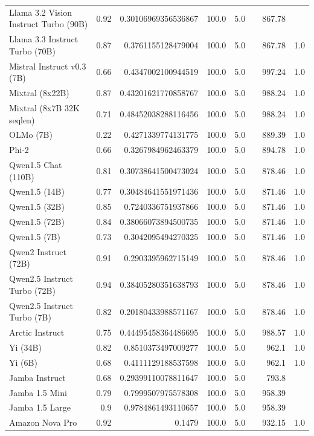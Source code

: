 \begin{table}[htp]
{\begin{tabular}{lrrrrrrr}
Llama 3.2 Vision Instruct Turbo (90B) & 0.92 & 0.30106969356536867 & 100.0 & 5.0 &  & 867.78 &  \\
Llama 3.3 Instruct Turbo (70B) & 0.87 & 0.3761155128479004 & 100.0 & 5.0 &  & 867.78 & 1.0 \\
Mistral Instruct v0.3 (7B) & 0.66 & 0.4347002100944519 & 100.0 & 5.0 &  & 997.24 & 1.0 \\
Mixtral (8x22B) & 0.87 & 0.43201621770858767 & 100.0 & 5.0 &  & 988.24 & 1.0 \\
Mixtral (8x7B 32K seqlen) & 0.71 & 0.48452038288116456 & 100.0 & 5.0 &  & 988.24 & 1.0 \\
OLMo (7B) & 0.22 & 0.4271339774131775 & 100.0 & 5.0 &  & 889.39 & 1.0 \\
Phi-2 & 0.66 & 0.3267984962463379 & 100.0 & 5.0 &  & 894.78 & 1.0 \\
Qwen1.5 Chat (110B) & 0.81 & 0.30738641500473024 & 100.0 & 5.0 &  & 878.46 & 1.0 \\
Qwen1.5 (14B) & 0.77 & 0.30484641551971436 & 100.0 & 5.0 &  & 871.46 & 1.0 \\
Qwen1.5 (32B) & 0.85 & 0.7240336751937866 & 100.0 & 5.0 &  & 871.46 & 1.0 \\
Qwen1.5 (72B) & 0.84 & 0.38066073894500735 & 100.0 & 5.0 &  & 871.46 & 1.0 \\
Qwen1.5 (7B) & 0.73 & 0.3042095494270325 & 100.0 & 5.0 &  & 871.46 & 1.0 \\
Qwen2 Instruct (72B) & 0.91 & 0.2903395962715149 & 100.0 & 5.0 &  & 878.46 & 1.0 \\
Qwen2.5 Instruct Turbo (72B) & 0.94 & 0.38405280351638793 & 100.0 & 5.0 &  & 878.46 & 1.0 \\
Qwen2.5 Instruct Turbo (7B) & 0.82 & 0.20180433988571167 & 100.0 & 5.0 &  & 878.46 & 1.0 \\
Arctic Instruct & 0.75 & 0.44495458364486695 & 100.0 & 5.0 &  & 988.57 & 1.0 \\
Yi (34B) & 0.82 & 0.8510373497009277 & 100.0 & 5.0 &  & 962.1 & 1.0 \\
Yi (6B) & 0.68 & 0.4111129188537598 & 100.0 & 5.0 &  & 962.1 & 1.0 \\
Jamba Instruct & 0.68 & 0.29399110078811647 & 100.0 & 5.0 &  & 793.8 &  \\
Jamba 1.5 Mini & 0.79 & 0.7999507975578308 & 100.0 & 5.0 &  & 958.39 &  \\
Jamba 1.5 Large & 0.9 & 0.9784861493110657 & 100.0 & 5.0 &  & 958.39 &  \\
Amazon Nova Pro & 0.92 & 0.1479 & 100.0 & 5.0 &  & 932.15 & 1.0 \\

\end{tabular}}
\end{table}
